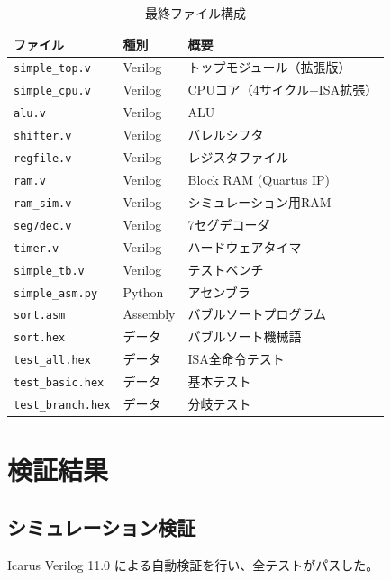 \documentclass[a4paper,11pt]{ltjsarticle}
\begin{document}
\begin{table}[h]
\centering
\caption{最終ファイル構成}
\label{tab:files}
\small
\begin{tabular}{lll}
\toprule
ファイル & 種別 & 概要 \\
\midrule
\texttt{simple\_top.v}   & Verilog & トップモジュール（拡張版） \\
\texttt{simple\_cpu.v}   & Verilog & CPUコア（4サイクル+ISA拡張） \\
\texttt{alu.v}           & Verilog & ALU \\
\texttt{shifter.v}       & Verilog & バレルシフタ \\
\texttt{regfile.v}       & Verilog & レジスタファイル \\
\texttt{ram.v}           & Verilog & Block RAM (Quartus IP) \\
\texttt{ram\_sim.v}       & Verilog & シミュレーション用RAM \\
\texttt{seg7dec.v}       & Verilog & 7セグデコーダ \\
\texttt{timer.v}         & Verilog & ハードウェアタイマ \\
\texttt{simple\_tb.v}     & Verilog & テストベンチ \\
\midrule
\texttt{simple\_asm.py}   & Python  & アセンブラ \\
\texttt{sort.asm}        & Assembly & バブルソートプログラム \\
\texttt{sort.hex}        & データ  & バブルソート機械語 \\
\texttt{test\_all.hex}    & データ  & ISA全命令テスト \\
\texttt{test\_basic.hex}  & データ  & 基本テスト \\
\texttt{test\_branch.hex} & データ  & 分岐テスト \\
\bottomrule
\end{tabular}
\end{table}


\section{検証結果}

\subsection{シミュレーション検証}

Icarus Verilog 11.0 による自動検証を行い、全テストがパスした。
\end{document}
